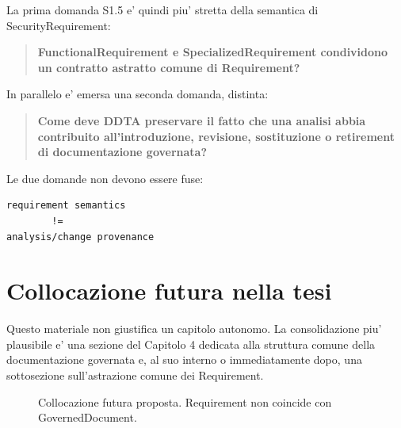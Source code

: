 \documentclass[11pt,a4paper]{article}
\begin{document}
La prima domanda S1.5 e' quindi piu' stretta della semantica di SecurityRequirement:

\begin{quote}
\textbf{FunctionalRequirement e SpecializedRequirement condividono un contratto astratto comune di Requirement?}
\end{quote}

In parallelo e' emersa una seconda domanda, distinta:

\begin{quote}
\textbf{Come deve DDTA preservare il fatto che una analisi abbia contribuito all'introduzione, revisione, sostituzione o retirement di documentazione governata?}
\end{quote}

Le due domande non devono essere fuse:

\begin{lstlisting}
requirement semantics
        !=
analysis/change provenance
\end{lstlisting}

\section{Collocazione futura nella tesi}

Questo materiale non giustifica un capitolo autonomo. La consolidazione piu' plausibile e' una sezione del Capitolo 4 dedicata alla struttura comune della documentazione governata e, al suo interno o immediatamente dopo, una sottosezione sull'astrazione comune dei Requirement.

\begin{figure}[h]
\centering
{}
\caption{Collocazione futura proposta. Requirement non coincide con GovernedDocument.}
\end{figure}
\end{document}
